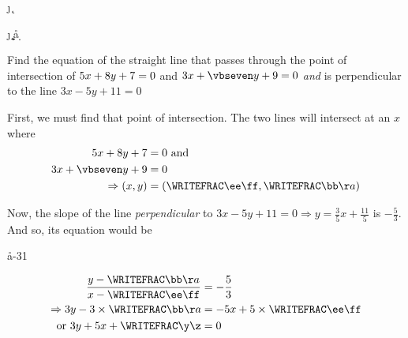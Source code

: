 


\EXPR[0]{\vbseven}{\vbtwo / \vbsix} %
\MULTIPLY\vbthree\vbfour\p
\MULTIPLY\vbfour\vbtwo\q
\MULTIPLY\vbseven\vbone\j
\MULTIPLY\vbfive\vbone\k
\MULTIPLY\vbseven\vbthree\m
\MULTIPLY\vbfive\vbtwo\n

\SUBTRACT\j\q\a
\SUBTRACT\p\k\b
\SUBTRACT\m\n\d
\FRACTIONSIMPLIFY\b\a\bb\aa
\FRACTIONSIMPLIFY\d\a\cc\dd
\FRACMULT\cc{}\ee\ff

\question[4] Find the equation of the straight line that passes through the point of intersection of 
$5 x + 8 y + 7 = 0$ and $\vbfour x + \vbseven y + \vbfive = 0$ \textit{and} is 
perpendicular to the line $3x-5y+11 = 0$


\watchout

\ifprintanswers
\fi 

\begin{solution}[\halfpage]
	First, we must find that point of intersection. The two lines will intersect at an $x$ where
	\begin{align}
	    \vbone x + \vbtwo y + \vbthree &= 0 \text{ and } \\
	    \vbfour x + \vbseven y + \vbfive &= 0 \\ 
      \Rightarrow (x,y) &= (\WRITEFRAC\ee\ff,\WRITEFRAC\bb\aa) 
	\end{align}
	
	Now, the slope of the line \textit{ perpendicular } to 
	$3x - 5y + 11 = 0 \Rightarrow y = \frac{3}{5}x + \frac{11}{5}$ is $-\frac{5}{3}$. And so, its equation
	would be 

  \FRACMULT\bb\aa{-3}{1}\jj\kk
  \FRACMULT\ee{}\mm\nn
  \FRACADD\jj\kk\mm\nn\y\z

	\begin{align}
		\dfrac{y - \WRITEFRAC\bb\aa}{x - \WRITEFRAC\ee\ff} &= -\dfrac{5}{3} \\
		\Rightarrow 3y - 3\times\WRITEFRAC\bb\aa &= -5x + 5\times\WRITEFRAC\ee\ff \\
		\text{ or } 3y + 5x + \WRITEFRAC\y\z &= 0
	\end{align}
	
\end{solution}

